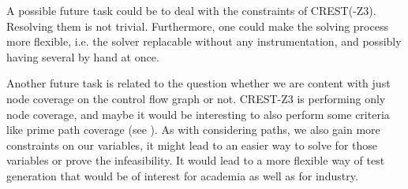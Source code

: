 \documentclass[oribibl]{llncs}
\begin{document}
A possible future task could be to deal with the constraints of \textsc{CREST(-Z3)}. Resolving them is not trivial. Furthermore, one could make the solving process more flexible, i.e. the solver replacable without any instrumentation, and possibly having several by hand at once.

Another future task is related to the question whether we are content with just node coverage on the control flow graph or not. \textsc{CREST-Z3} is performing only node coverage, and maybe it would be interesting to also perform some criteria like prime path coverage (see \cite{ammann2008introduction}). As with considering paths, we also gain more constraints on our variables, it might lead to an easier way to solve for those variables or prove the infeasibility. It would lead to a more flexible way of test generation that would be of interest for academia as well as for industry.





\end{document}
